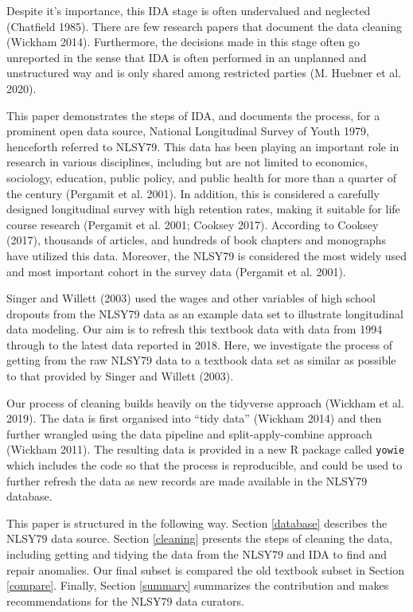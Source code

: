\documentclass{article}
\begin{document}
Despite it's importance, this IDA stage is often undervalued and neglected (Chatfield 1985). There are few research papers that document the data cleaning (Wickham 2014). Furthermore, the decisions made in this stage often go unreported in the sense that IDA is often performed in an unplanned and unstructured way and is only shared among restricted parties (M. Huebner et al. 2020).

This paper demonstrates the steps of IDA, and documents the process, for a prominent open data source, National Longitudinal Survey of Youth 1979, henceforth referred to NLSY79. This data has been playing an important role in research in various disciplines, including but are not limited to economics, sociology, education, public policy, and public health for more than a quarter of the century (Pergamit et al. 2001). In addition, this is considered a carefully designed longitudinal survey with high retention rates, making it suitable for life course research (Pergamit et al. 2001; Cooksey 2017). According to Cooksey (2017), thousands of articles, and hundreds of book chapters and monographs have utilized this data. Moreover, the NLSY79 is considered the most widely used and most important cohort in the survey data (Pergamit et al. 2001).

Singer and Willett (2003) used the wages and other variables of high school dropouts from the NLSY79 data as an example data set to illustrate longitudinal data modeling. Our aim is to refresh this textbook data with data from 1994 through to the latest data reported in 2018. Here, we investigate the process of getting from the raw NLSY79 data to a textbook data set as similar as possible to that provided by Singer and Willett (2003).

Our process of cleaning builds heavily on the tidyverse approach (Wickham et al. 2019). The data is first organised into ``tidy data'' (Wickham 2014) and then further wrangled using the data pipeline and split-apply-combine approach (Wickham 2011). The resulting data is provided in a new R package called \texttt{yowie} which includes the code so that the process is reproducible, and could be used to further refresh the data as new records are made available in the NLSY79 database.

This paper is structured in the following way. Section \ref{database} describes the NLSY79 data source. Section \ref{cleaning} presents the steps of cleaning the data, including getting and tidying the data from the NLSY79 and IDA to find and repair anomalies. Our final subset is compared the old textbook subset in Section \ref{compare}. Finally, Section \ref{summary} summarizes the contribution and makes recommendations for the NLSY79 data curators.
\end{document}
